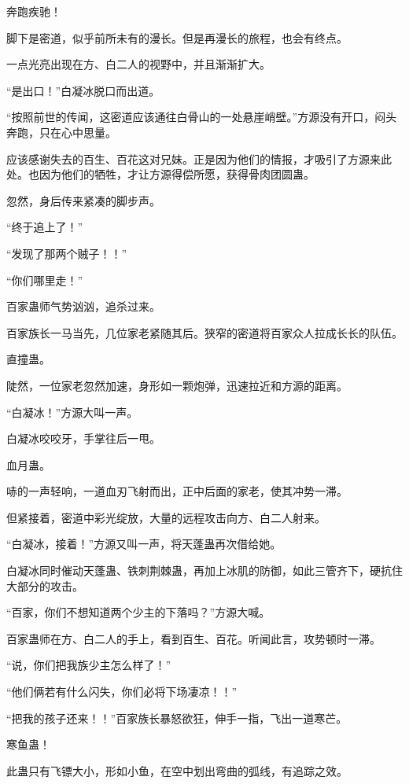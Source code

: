 
\begin{this_body}

奔跑疾驰！

脚下是密道，似乎前所未有的漫长。但是再漫长的旅程，也会有终点。

一点光亮出现在方、白二人的视野中，并且渐渐扩大。

“是出口！”白凝冰脱口而出道。

“按照前世的传闻，这密道应该通往白骨山的一处悬崖峭壁。”方源没有开口，闷头奔跑，只在心中思量。

应该感谢失去的百生、百花这对兄妹。正是因为他们的情报，才吸引了方源来此处。也因为他们的牺牲，才让方源得偿所愿，获得骨肉团圆蛊。

忽然，身后传来紧凑的脚步声。

“终于追上了！”

“发现了那两个贼子！！”

“你们哪里走！”

百家蛊师气势汹汹，追杀过来。

百家族长一马当先，几位家老紧随其后。狭窄的密道将百家众人拉成长长的队伍。

直撞蛊。

陡然，一位家老忽然加速，身形如一颗炮弹，迅速拉近和方源的距离。

“白凝冰！”方源大叫一声。

白凝冰咬咬牙，手掌往后一甩。

血月蛊。

哧的一声轻响，一道血刃飞射而出，正中后面的家老，使其冲势一滞。

但紧接着，密道中彩光绽放，大量的远程攻击向方、白二人射来。

“白凝冰，接着！”方源又叫一声，将天蓬蛊再次借给她。

白凝冰同时催动天蓬蛊、铁刺荆棘蛊，再加上冰肌的防御，如此三管齐下，硬抗住大部分的攻击。

“百家，你们不想知道两个少主的下落吗？”方源大喊。

百家蛊师在方、白二人的手上，看到百生、百花。听闻此言，攻势顿时一滞。

“说，你们把我族少主怎么样了！”

“他们俩若有什么闪失，你们必将下场凄凉！！”

“把我的孩子还来！！”百家族长暴怒欲狂，伸手一指，飞出一道寒芒。

寒鱼蛊！

此蛊只有飞镖大小，形如小鱼，在空中划出弯曲的弧线，有追踪之效。


\end{this_body}
